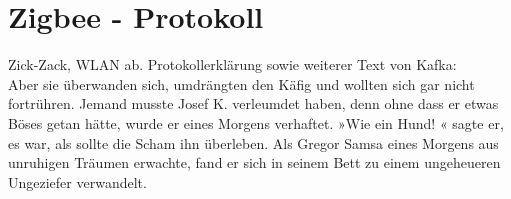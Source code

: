 \section{Zigbee - Protokoll}\label{s:Grundlagen}

Zick-Zack, WLAN ab. Protokollerklärung sowie weiterer Text von Kafka:\\
Aber sie überwanden sich, umdrängten den Käfig und wollten sich gar nicht fortrühren. Jemand musste Josef K. verleumdet haben, denn ohne dass er etwas Böses getan hätte, wurde er eines Morgens verhaftet. »Wie ein Hund! « sagte er, es war, als sollte die Scham ihn überleben. Als Gregor Samsa eines Morgens aus unruhigen Träumen erwachte, fand er sich in seinem Bett zu einem ungeheueren Ungeziefer verwandelt.